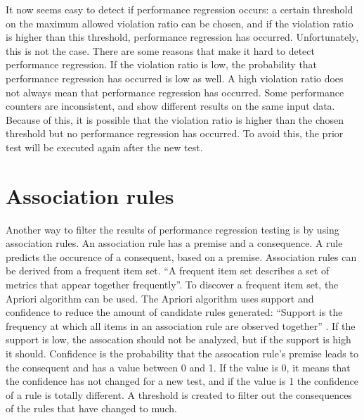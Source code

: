 It now seems easy to detect if performance regression occurs: a certain threshold on the maximum allowed violation ratio can be chosen, and if the violation ratio is higher than this threshold, performance regression has occurred. Unfortunately, this is not the case. There are some reasons that make it hard to detect performance regression. If the violation ratio is low, the probability that performance regression has occurred is low as well. A high violation ratio does not always mean that performance regression has occurred. Some performance counters are inconsistent, and show different results on the same input data. Because of this, it is possible that the violation ratio is higher than the chosen threshold but no performance regression has occurred. To avoid this, the prior test will be executed again after the new test.

\section{Association rules}
Another way to filter the results of performance regression testing is by using association rules. An association rule has a premise and a consequence. A rule predicts the occurence of a consequent, based on a premise. Association rules can be derived from a frequent item set. ``A frequent item set describes a set of metrics that appear together frequently''\cite{foo2010mining}. To discover a frequent item set, the Apriori algorithm can be used. The Apriori algorithm uses support and confidence to reduce the amount of candidate rules generated:
``Support is the frequency at which all items in an association rule are observed together'' \cite{foo2010mining}. If the support is low, the assocation should not be analyzed, but if the support is high it should. Confidence is the probability that the assocation rule's premise leads to the consequent and has a value between 0 and 1. If the value is 0, it means that the confidence has not changed for a new test, and if the value is 1 the confidence of a rule is totally different. A threshold is created to filter out the consequences of the rules that have changed to much.






